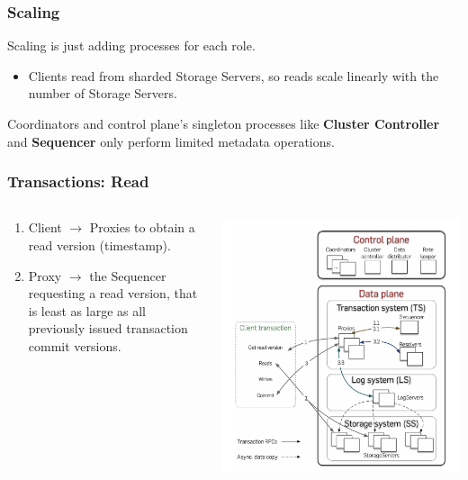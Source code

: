\begin{frame}
	\frametitle{Scaling}
Scaling is just adding processes for each role. \\

\begin{itemize}
\item Clients read from sharded Storage Servers, so reads scale
linearly with the number of Storage Servers. 
\end{itemize}

\vspace{0.5cm}
Coordinators and control plane's singleton processes like \textbf{Cluster Controller} and \textbf{Sequencer} only perform limited metadata operations.
	
\end{frame}

\begin{frame}
    \frametitle{Transactions: Read}
    \begin{columns}
        \begin{column}{0.5\textwidth}
            \begin{enumerate}
    \item Client $\rightarrow$ Proxies to obtain a read version (timestamp).
    \item Proxy $\rightarrow$ the Sequencer requesting a read version, that is  least as large as all previously issued transaction commit versions.
            \end{enumerate}
        \end{column}
        \begin{column}{0.5\textwidth}
            \centering
            \includegraphics[width=\textwidth]{img/2-Architecture/Architecture and transaction processing.png}
        \end{column}
    \end{columns}
\end{frame}

